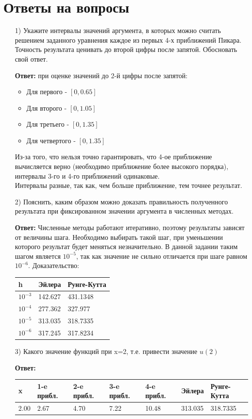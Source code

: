 \documentclass[14pt, a4paper]{extarticle}
\begin{document}
\section*{Ответы на вопросы}
\begin{enumerate}
	\item[1)] Укажите интервалы значений аргумента, в которых можно считать решением заданного уравнения каждое из первых 4-х приближений Пикара. Точность результата ценивать до второй цифры после запятой. Обосновать свой ответ.\par
		\textbf{Ответ:} при оценке значений до 2-й цифры после запятой:
		\begin{itemize}
			\item Для первого - $[0, 0.65]$
			\item Для второго - $[0, 1.05]$
			\item Для третьего - $[0, 1.35]$
			\item Для четвертого - $[0, 1.35]$
		\end{itemize} 
		Из-за того, что нельзя точно гарантировать, что 4-ое приближение вычисляется верно (необходимо приближение более высокого порядка), интервалы 3-го и 4-го приближений одинаковые. \\
		Интервалы разные, так как, чем больше приближение, тем точнее результат.
	\item[2)] Пояснить, каким образом можно доказать правильность полученного результата при фиксированном значении аргумента в численных методах.\par
		\textbf{Ответ:} Численные методы работают итеративно, поэтому результаты зависят от величины шага. Необходимо выбирать такой шаг, при уменьшении которого результат будет меняться незначительно. В данной задании таким шагом является $10^{-5}$, так как значение не сильно отличается при шаге равном $10^{-6}$. Доказательство:
		
		\begin{table}[h]
			\begin{tabular}[scale=0.9]{|l|l|l|}\hline
				h & Эйлера  & Рунге-Кутта \\ \hline
				$10^{-3}$ & 142.627 & 431.1348 \\ \hline
				$10^{-4}$ & 277.362 & 327.977  \\ \hline
				$10^{-5}$ & 313.035 & 318.7335 \\ \hline
				$10^{-6}$ & 317.245 & 317.8234 \\ \hline     
			\end{tabular}
		\end{table}
	\item[3)] Какого значение функций при x=2, т.е. привести значение $u(2)$\par
		\textbf{Ответ:}
		\begin{table}[h]
			\begin{tabular}[scale=0.9]{|l|l|l|l|l|l|l|}\hline
				x & 1-e прибл. & 2-e прибл. & 3-e прибл. & 4-e прибл. & Эйлера  & Рунге-Кутта \\ \hline
				2.00 & 2.67   & 4.70    & 7.22  & 10.48  & 313.035  & 318.7335 \\ \hline     
			\end{tabular}
		\end{table}
\end{enumerate}
\end{document}
